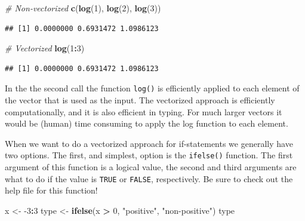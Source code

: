 \documentclass[
]{book}
\newenvironment{Shaded}{\begin{snugshade}}{\end{snugshade}}
\newcommand{\CommentTok}[1]{\textcolor[rgb]{0.56,0.35,0.01}{\textit{#1}}}
\newcommand{\DecValTok}[1]{\textcolor[rgb]{0.00,0.00,0.81}{#1}}
\newcommand{\KeywordTok}[1]{\textcolor[rgb]{0.13,0.29,0.53}{\textbf{#1}}}
\newcommand{\NormalTok}[1]{#1}
\newcommand{\OperatorTok}[1]{\textcolor[rgb]{0.81,0.36,0.00}{\textbf{#1}}}
\newcommand{\StringTok}[1]{\textcolor[rgb]{0.31,0.60,0.02}{#1}}
\begin{document}
\begin{Shaded}
\begin{Highlighting}[]
\CommentTok{# Non-vectorized}
\KeywordTok{c}\NormalTok{(}\KeywordTok{log}\NormalTok{(}\DecValTok{1}\NormalTok{), }\KeywordTok{log}\NormalTok{(}\DecValTok{2}\NormalTok{), }\KeywordTok{log}\NormalTok{(}\DecValTok{3}\NormalTok{))}
\end{Highlighting}
\end{Shaded}

\begin{verbatim}
## [1] 0.0000000 0.6931472 1.0986123
\end{verbatim}

\begin{Shaded}
\begin{Highlighting}[]
\CommentTok{# Vectorized}
\KeywordTok{log}\NormalTok{(}\DecValTok{1}\OperatorTok{:}\DecValTok{3}\NormalTok{)}
\end{Highlighting}
\end{Shaded}

\begin{verbatim}
## [1] 0.0000000 0.6931472 1.0986123
\end{verbatim}

In the the second call the function \texttt{log()} is efficiently applied to each element of the vector that is used as the input. The vectorized approach is efficiently computationally, and it is also efficient in typing. For much larger vectors it would be (human) time consuming to apply the log function to each element.

When we want to do a vectorized approach for if-statements we generally have two options. The first, and simplest, option is the \texttt{ifelse()} function. The first argument of this function is a logical value, the second and third arguments are what to do if the value is \texttt{TRUE} or \texttt{FALSE}, respectively. Be sure to check out the help file for this function!

\begin{Shaded}
\begin{Highlighting}[]
\NormalTok{x <-}\StringTok{ }\DecValTok{-3}\OperatorTok{:}\DecValTok{3}
\NormalTok{type <-}\StringTok{ }\KeywordTok{ifelse}\NormalTok{(x }\OperatorTok{>}\StringTok{ }\DecValTok{0}\NormalTok{, }\StringTok{"positive"}\NormalTok{, }\StringTok{"non-positive"}\NormalTok{)}
\NormalTok{type}
\end{Highlighting}
\end{Shaded}
\end{document}

